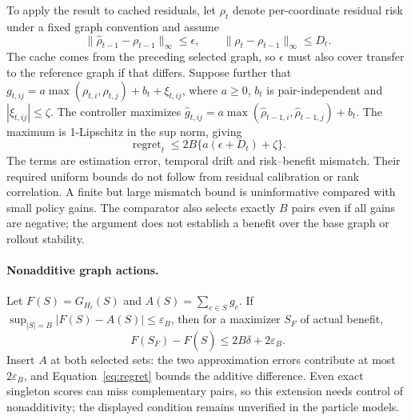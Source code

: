 To apply the result to cached residuals, let $\rho_t$ denote per-coordinate residual risk under a fixed graph convention and assume
\begin{equation}
 \|\widehat\rho_{t-1}-\rho_{t-1}\|_\infty\le\epsilon,
 \qquad \|\rho_t-\rho_{t-1}\|_\infty\le D_t.
\end{equation}
The cache comes from the preceding selected graph, so $\epsilon$ must also cover transfer to the reference graph if that differs. Suppose further that
$g_{t,ij}=a\max(\rho_{t,i},\rho_{t,j})+b_t+\xi_{t,ij}$,
where $a\ge0$, $b_t$ is pair-independent and $|\xi_{t,ij}|\le\zeta$.
The controller maximizes $\widehat g_{t,ij}=a\max(\widehat\rho_{t-1,i},\widehat\rho_{t-1,j})+b_t$. The maximum is 1-Lipschitz in the sup norm, giving
\begin{equation}
 \operatorname{regret}_t\le2B\{a(\epsilon+D_t)+\zeta\}.
\end{equation}
The terms are estimation error, temporal drift and risk--benefit mismatch. Their required uniform bounds do not follow from residual calibration or rank correlation. A finite but large mismatch bound is uninformative compared with small policy gains. The comparator also selects exactly $B$ pairs even if all gains are negative; the argument does not establish a benefit over the base graph or rollout stability.

\paragraph{Nonadditive graph actions.}\label{sec:nonadditive-allocation}
Let $F(S)=G_{H_t}(S)$ and $A(S)=\sum_{e\in S}g_e$. If
$\sup_{|S|=B}|F(S)-A(S)|\le\varepsilon_B$, then for a maximizer $S_F$ of actual benefit,
\begin{equation}
 F(S_F)-F(\widehat S)\le2B\delta+2\varepsilon_B.
 \label{eq:nonadditive-regret}
\end{equation}
Insert $A$ at both selected sets: the two approximation errors contribute at most $2\varepsilon_B$, and Equation~\ref{eq:regret} bounds the additive difference. Even exact singleton scores can miss complementary pairs, so this extension needs control of nonadditivity; the displayed condition remains unverified in the particle models.


